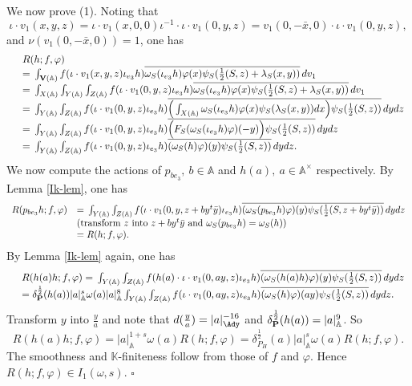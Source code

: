 \documentclass[11pt]{amsart}
\numberwithin{equation}{section}
\theoremstyle{definition}
\begin{document}
We now prove (1). Noting that 
$$\iota\cdot v_1(x,y,z)=\iota\cdot v_1(x,0,0)\iota^{-1}\cdot \iota\cdot v_1(0,y,z)=v_1(0,-\bar{x},0)\cdot \iota\cdot v_1(0,y,z),
$$
and $\nu(v_1(0,-\bar{x},0))=1$, one has 
$$
\begin{array}{ll}
& R( h;f,\varphi)\\
&={\displaystyle}\int_{ \bold V({\mathbb{A}})}f(\iota\cdot v_1(x,y,z) \iota_{e_3} h)
\overline{\omega_S(\iota_{e_3} h)\varphi(x)\psi_S(\frac{1}{2}(S,z)+\lambda_S(x,y))}\, dv_1 \\
&={\displaystyle}\int_{ X({\mathbb{A}})}\int_{ Y({\mathbb{A}})}\int_{ Z({\mathbb{A}})}f(\iota\cdot v_1(0,y,z) \iota_{e_3} h)
\overline{\omega_S(\iota_{e_3} h)\varphi(x)\psi_S(\frac{1}{2}(S,z)+\lambda_S(x,y))}\, dv_1\\
 &={\displaystyle}\int_{ Y({\mathbb{A}})}\int_{ Z({\mathbb{A}})}f(\iota\cdot v_1(0,y,z) \iota_{e_3} h)
\overline{\Big(\int_{ X({\mathbb{A}})} 
\omega_S(\iota_{e_3} h)\varphi(x)\psi_S(\lambda_S(x,y))dx\Big)\psi_S(\frac{1}{2}(S,z))}\, dydz\\
 &={\displaystyle}\int_{ Y({\mathbb{A}})}\int_{ Z({\mathbb{A}})}f(\iota\cdot v_1(0,y,z) \iota_{e_3} h)
\overline{\Big(
F_S(\omega_S(\iota_{e_3} h)\varphi)(-y)\Big)\psi_S(\frac{1}{2}(S,z))}\, dydz\\
&={\displaystyle}\int_{ Y({\mathbb{A}})}\int_{ Z({\mathbb{A}})}f(\iota\cdot v_1(0,y,z) \iota_{e_3} h)
\overline{(\omega_S(h)\varphi)(y)\psi_S(\frac{1}{2}(S,z))}\, dydz.\\
\end{array}
$$
We now compute the actions of $p_{be_3},\ b\in {\mathbb{A}}$ and $h(a),\ a\in {\mathbb{A}}^\times$ respectively. 
By Lemma \ref{Ik-lem}, one has 
$$
\begin{array}{ll}
R(p_{be_3} h;f,\varphi) &={\displaystyle}\int_{ Y({\mathbb{A}})}\int_{ Z({\mathbb{A}})}f(\iota\cdot v_1(0,y,z+by{}^t\bar{y}) \iota_{e_3} h)
\overline{(\omega_S(p_{be_3}h)\varphi)(y)\psi_S(\frac{1}{2}(S,z+by{}^t\bar{y}))}\, dydz \\
&({\rm transform }\ z\ {\rm into}\ z+by{}^t\bar{y}\ {\rm and}\ \omega_S(p_{be_3}h)=\omega_S(h))\\
&=R(h;f,\varphi). 
\end{array}
$$
By Lemma \ref{Ik-lem} again, one has 
$$
\begin{array}{ll}
& R(h(a) h;f,\varphi)={\displaystyle}\int_{ Y({\mathbb{A}})}\int_{ Z({\mathbb{A}})}f(h(a)\cdot\iota\cdot v_1(0,ay,z) \iota_{e_3} h)
\overline{(\omega_S(h(a) h)\varphi)(y)\psi_S(\frac{1}{2}(S,z))}\, dydz \\
&=\delta^{\frac{1}{2}}_{\bold P}(h(a))|a|^s_{\mathbb{A}} \omega(a)|a|^8_{\mathbb{A}} 
{\displaystyle}\int_{ Y({\mathbb{A}})}\int_{ Z({\mathbb{A}})}f(\iota\cdot v_1(0,ay,z) \iota_{e_3} h)
\overline{(\omega_S(h)\varphi)(ay)\psi_S(\frac{1}{2}(S,z))}\, dydz.
\end{array}
$$
Transform $y$ into $\frac{y}{a}$ and note that $d(\frac{y}{a})=|a|^{-16}_\Ady$ and 
$\delta^{\frac{1}{2}}_{\bold P}(h(a))=|a|^9_{\mathbb{A}}$. So 
$$
R(h(a) h;f,\varphi)=|a|^{1+s}_{\mathbb{A}}\omega(a)R(h;f,\varphi)=\delta^{\frac{1}{2}}_{P_H}(a)|a|^{s}_{\mathbb{A}}\omega(a)R(h;f,\varphi).
$$
The smoothness and $\mathbb{K}$-finiteness follow from those of $f$ and $\varphi$. 
Hence $R(h;f,\varphi)\in I_1(\omega,s)$. $\square$
\end{document}

